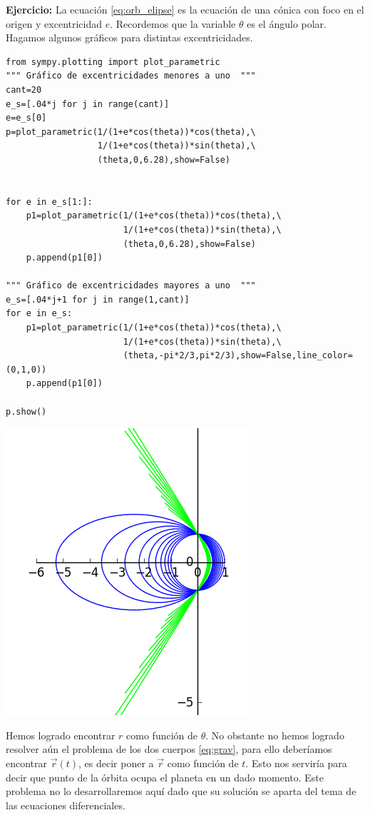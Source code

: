 \noindent\textbf{Ejercicio:} La ecuación \eqref{eq:orb_elipse} es la ecuación de una cónica con foco en el origen y excentricidad $e$.
Recordemos que la variable $\theta$ es el ángulo polar. Hagamos algunos gráficos para distintas excentricidades.
\begin{lstlisting}
from sympy.plotting import plot_parametric
""" Gráfico de excentricidades menores a uno  """
cant=20
e_s=[.04*j for j in range(cant)]
e=e_s[0]
p=plot_parametric(1/(1+e*cos(theta))*cos(theta),\
                  1/(1+e*cos(theta))*sin(theta),\
                  (theta,0,6.28),show=False)


for e in e_s[1:]:
    p1=plot_parametric(1/(1+e*cos(theta))*cos(theta),\
                       1/(1+e*cos(theta))*sin(theta),\
                       (theta,0,6.28),show=False)
    p.append(p1[0])

""" Gráfico de excentricidades mayores a uno  """
e_s=[.04*j+1 for j in range(1,cant)]
for e in e_s:
    p1=plot_parametric(1/(1+e*cos(theta))*cos(theta),\
                       1/(1+e*cos(theta))*sin(theta),\
                       (theta,-pi*2/3,pi*2/3),show=False,line_color=(0,1,0))
    p.append(p1[0])

p.show()
\end{lstlisting}

\begin{center}
\includegraphics[scale=.5]{imagenes/conicas.png}
\end{center}


Hemos logrado encontrar $r$ como función de $\theta$. No obstante
no hemos logrado resolver aún el problema de los dos cuerpos \eqref{eq:grav}, para ello deberíamos encontrar $\vec{r}(t)$, es decir poner a $
\vec{r}$ como función de $t$. Esto nos serviría para decir que punto de la órbita ocupa el planeta en un dado momento. Este problema no lo desarrollaremos aquí dado
que su solución se aparta del tema de las ecuaciones diferenciales.


